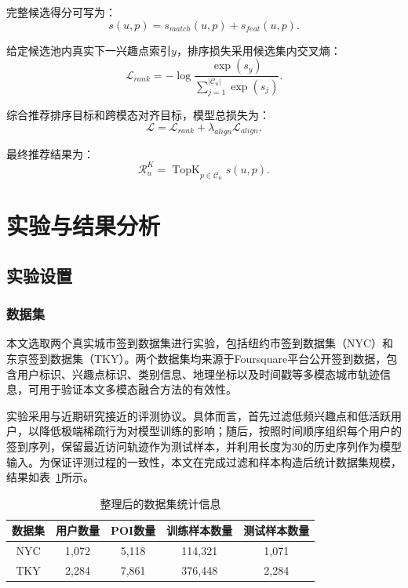 \documentclass{rjthesis}
\begin{document}
完整候选得分可写为：
\begin{equation}
s(u,p)=s_{match}(u,p)+s_{feat}(u,p).
\end{equation}

给定候选池内真实下一兴趣点索引$y$，排序损失采用候选集内交叉熵：
\begin{equation}
\mathcal L_{rank}=-\log\frac{\exp(s_y)}{\sum_{j=1}^{|\mathcal C_u|}\exp(s_j)}.
\end{equation}

综合推荐排序目标和跨模态对齐目标，模型总损失为：
\begin{equation}
\mathcal L=\mathcal L_{rank}+\lambda_{align}\mathcal L_{align}.
\end{equation}

最终推荐结果为：
\begin{equation}
\mathcal R_u^K=\operatorname{TopK}_{p\in\mathcal C_u}s(u,p).
\end{equation}

\section{实验与结果分析}

\subsection{实验设置}

\subsubsection{数据集}

本文选取两个真实城市签到数据集进行实验，包括纽约市签到数据集（NYC）和东京签到数据集（TKY）。两个数据集均来源于Foursquare平台公开签到数据\cite{yang2015modeling}，包含用户标识、兴趣点标识、类别信息、地理坐标以及时间戳等多模态城市轨迹信息，可用于验证本文多模态融合方法的有效性。

实验采用与近期研究接近的评测协议\cite{comapoi}。具体而言，首先过滤低频兴趣点和低活跃用户，以降低极端稀疏行为对模型训练的影响；随后，按照时间顺序组织每个用户的签到序列，保留最近访问轨迹作为测试样本，并利用长度为30的历史序列作为模型输入。为保证评测过程的一致性，本文在完成过滤和样本构造后统计数据集规模，结果如表~\ref{tab:dataset}所示。

\begin{table}[htbp]
\centering
\caption{整理后的数据集统计信息}
\label{tab:dataset}
\begin{tabular}{c|cccc}
\hline
数据集 & 用户数量 & POI数量 & 训练样本数量 & 测试样本数量 \\
\hline
NYC & 1,072 & 5,118 & 114,321 & 1,071 \\
TKY & 2,284 & 7,861 & 376,448 & 2,284 \\
\hline
\end{tabular}
\end{table}
\end{document}
